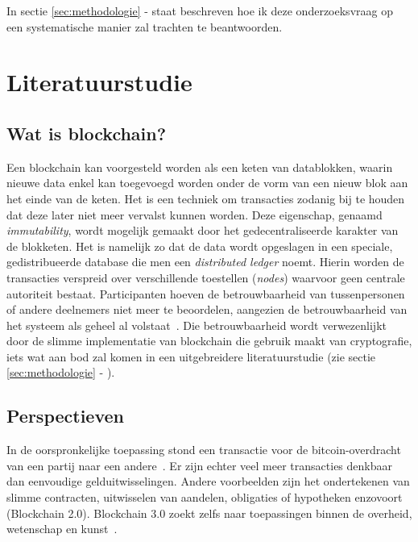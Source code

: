 In sectie \ref{sec:methodologie} -  staat beschreven hoe ik deze onderzoeksvraag op een systematische manier zal trachten te beantwoorden.





\section{Literatuurstudie}
\label{sec:state-of-the-art}

\subsection{Wat is blockchain?}
\label{sub:wat-is-blockchain}

Een blockchain kan voorgesteld worden als een keten van datablokken, waarin nieuwe data enkel kan toegevoegd worden onder de vorm van een nieuw blok aan het einde van de keten. Het is een techniek om transacties zodanig bij te houden dat deze later niet meer vervalst kunnen worden. Deze eigenschap, genaamd \textit{immutability}, wordt mogelijk gemaakt door het gedecentraliseerde karakter van de blokketen. Het is namelijk zo dat de data wordt opgeslagen in een speciale, gedistribueerde database die men een \textit{distributed ledger} noemt. Hierin worden de transacties verspreid over verschillende toestellen (\textit{nodes}) waarvoor geen centrale autoriteit bestaat. Participanten hoeven de betrouwbaarheid van tussenpersonen of andere deelnemers niet meer te beoordelen, aangezien de betrouwbaarheid van het systeem als geheel al volstaat~\autocite{Nofer2017}. Die betrouwbaarheid wordt verwezenlijkt door de slimme implementatie van blockchain die gebruik maakt van cryptografie, iets wat aan bod zal komen in een uitgebreidere literatuurstudie (zie sectie \ref{sec:methodologie} - ).



\subsection{Perspectieven}
\label{sub:perspectieven}

In de oorspronkelijke toepassing stond een transactie voor de bitcoin-overdracht van een partij naar een andere~\autocite{Pierro2017}. Er zijn echter veel meer transacties denkbaar dan eenvoudige gelduitwisselingen. Andere voorbeelden zijn het ondertekenen van slimme contracten, uitwisselen van aandelen, obligaties of hypotheken enzovoort (Blockchain 2.0). Blockchain 3.0 zoekt zelfs naar toepassingen binnen de overheid, wetenschap en kunst~\autocite{Swan2015}.

